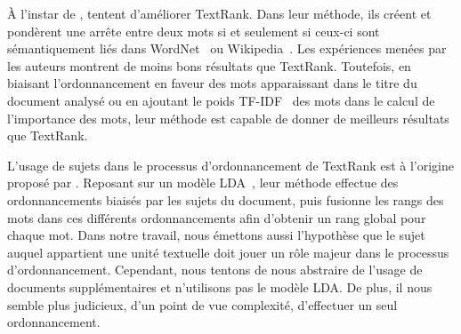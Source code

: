    À l'instar de ,
     tentent d'améliorer TextRank. Dans
    leur méthode, ils créent et pondèrent une arrête entre deux mots si et
    seulement si ceux-ci sont sémantiquement liés dans
    WordNet~\cite{miller1995wordnet} ou
    Wikipedia~\cite{milne2008wikipediasemanticrelatedness}. Les expériences
    menées par les auteurs montrent de moins bons résultats que TextRank.
    Toutefois, en biaisant l'ordonnancement en faveur des mots apparaissant dans
    le titre du document analysé ou en ajoutant le poids
    TF-IDF~\cite{jones1972tfidf} des mots dans le calcul de l'importance des
    mots, leur méthode est capable de donner de meilleurs résultats que
    TextRank.

    L'usage de sujets dans le processus d'ordonnancement de TextRank est à
    l'origine proposé par . Reposant sur un
    modèle LDA~\cite[Latent Dirichlet Allocation]{blei2003lda}, leur méthode
    effectue des ordonnancements biaisés par les sujets du document, puis
    fusionne les rangs des mots dans ces différents ordonnancements afin
    d'obtenir un rang global pour chaque mot. Dans notre travail, nous émettons
    aussi l'hypothèse que le sujet auquel appartient une unité textuelle doit
    jouer un rôle majeur dans le processus d'ordonnancement. Cependant, nous
    tentons de nous abstraire de l'usage de documents supplémentaires et
    n'utilisons pas le modèle LDA. De plus, il nous semble plus judicieux, d'un
    point de vue complexité, d'effectuer un seul ordonnancement.

